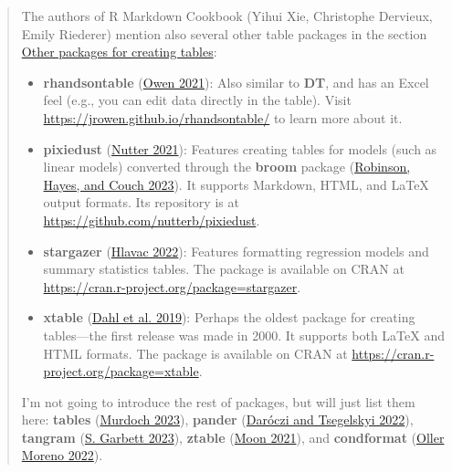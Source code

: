 \documentclass[
  letterpaper,
  DIV=11,
  numbers=noendperiod]{scrreprt}
\begin{document}
\begin{quote}
The authors of R Markdown Cookbook (Yihui Xie, Christophe Dervieux,
Emily Riederer) mention also several other table packages in the section
\href{https://bookdown.org/yihui/rmarkdown-cookbook/table-other.html}{Other
packages for creating tables}:

\begin{itemize}
\item
  \textbf{rhandsontable}
  (\href{https://bookdown.org/yihui/rmarkdown-cookbook/table-other.html\#ref-R-rhandsontable}{Owen
  2021}): Also similar to \textbf{DT}, and has an Excel feel (e.g., you
  can edit data directly in the table). Visit
  \url{https://jrowen.github.io/rhandsontable/} to learn more about it.
\item
  \textbf{pixiedust}
  (\href{https://bookdown.org/yihui/rmarkdown-cookbook/table-other.html\#ref-R-pixiedust}{Nutter
  2021}): Features creating tables for models (such as linear models)
  converted through the \textbf{broom} package
  (\href{https://bookdown.org/yihui/rmarkdown-cookbook/table-other.html\#ref-R-broom}{Robinson,
  Hayes, and Couch 2023}). It supports Markdown, HTML, and LaTeX output
  formats. Its repository is at
  \url{https://github.com/nutterb/pixiedust}.
\item
  \textbf{stargazer}
  (\href{https://bookdown.org/yihui/rmarkdown-cookbook/table-other.html\#ref-R-stargazer}{Hlavac
  2022}): Features formatting regression models and summary statistics
  tables. The package is available on CRAN at
  \url{https://cran.r-project.org/package=stargazer}.
\item
  \textbf{xtable}
  (\href{https://bookdown.org/yihui/rmarkdown-cookbook/table-other.html\#ref-R-xtable}{Dahl
  et al. 2019}): Perhaps the oldest package for creating tables---the
  first release was made in 2000. It supports both LaTeX and HTML
  formats. The package is available on CRAN at
  \url{https://cran.r-project.org/package=xtable}.
\end{itemize}

I'm not going to introduce the rest of packages, but will just list them
here: \textbf{tables}
(\href{https://bookdown.org/yihui/rmarkdown-cookbook/table-other.html\#ref-R-tables}{Murdoch
2023}), \textbf{pander}
(\href{https://bookdown.org/yihui/rmarkdown-cookbook/table-other.html\#ref-R-pander}{Daróczi
and Tsegelskyi 2022}), \textbf{tangram}
(\href{https://bookdown.org/yihui/rmarkdown-cookbook/table-other.html\#ref-R-tangram}{S.
Garbett 2023}), \textbf{ztable}
(\href{https://bookdown.org/yihui/rmarkdown-cookbook/table-other.html\#ref-R-ztable}{Moon
2021}), and \textbf{condformat}
(\href{https://bookdown.org/yihui/rmarkdown-cookbook/table-other.html\#ref-R-condformat}{Oller
Moreno 2022}).
\end{quote}
\end{document}
